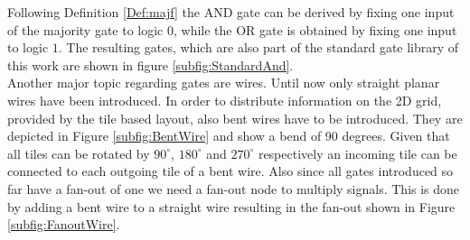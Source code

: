 Following Definition \ref{Def:majf} the AND gate can be derived by fixing one input of the majority gate to logic $0$, while the OR gate is obtained by fixing one input to logic $1$. The resulting gates, which are also part of the standard gate library of this work are shown in figure \ref{subfig:StandardAnd}.\\

Another major topic regarding gates are wires. Until now only straight planar wires have been introduced. In order to distribute information on the 2D grid, provided by the tile based layout, also bent wires have to be introduced. They are depicted in Figure \ref{subfig:BentWire} and show a bend of 90 degrees. Given that all tiles can be rotated by $90^{\circ}$, $180^{\circ}$ and $270^{\circ}$ respectively an incoming tile can be connected to each outgoing tile of a bent wire. Also since all gates introduced so far have a fan-out of one we need a fan-out node to multiply signals. This is done by adding a bent wire to a straight wire resulting in the fan-out shown in Figure \ref{subfig:FanoutWire}.\\
